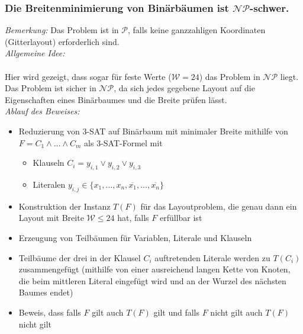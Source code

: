 \subsubsection{Die Breitenminimierung von Binärbäumen ist $\mathcal{NP}$-schwer.}
\ProofIdea
\textit{Bemerkung:} Das Problem ist in $\mathcal{P}$, falls keine ganzzahligen Koordinaten (Gitterlayout) erforderlich sind.\\
\textit{Allgemeine Idee:}\\
\\
Hier wird gezeigt, dass sogar für feste Werte ($\mathcal{W}=24$) das Problem in $\mathcal{NP}$ liegt. Das Problem ist sicher in $\mathcal{NP}$, da sich jedes gegebene Layout auf die Eigenschaften eines Binärbaumes und die Breite prüfen lässt.\\
\textit{Ablauf des Beweises:}
	\begin{itemize}
		\item Reduzierung von $3$-SAT auf Binärbaum mit minimaler Breite mithilfe von $F=C_1 \wedge \dots \wedge C_m$ als $3$-SAT-Formel mit
			\begin{itemize}
				\item Klauseln $C_i=y_{i,1}\vee y_{i,2}\vee y_{i,3}$
				\item Literalen $y_{i,j}\in\{x_1,\dots,x_n,\overline{x_1},\dots,\overline{x_n}\}$
			\end{itemize}
		\item Konstruktion der Instanz $T(F)$ für das Layoutproblem, die genau dann ein Layout mit Breite $\mathcal{W}\leq 24$ hat, falls $F$ erfüllbar ist
		\item Erzeugung von Teilbäumen für Variablen, Literale und Klauseln
		\item Teilbäume der drei in der Klausel $C_i$ auftretenden Literale werden zu $T(C_i)$ zusammengefügt (mithilfe von einer ausreichend langen Kette von Knoten, die beim mittleren Literal eingefügt wird und an der Wurzel des nächsten Baumes endet)
		\item Beweis, dass falls $F$ gilt auch $T(F)$ gilt und falls $F$ nicht gilt auch $T(F)$ nicht gilt
	\end{itemize}
\topbreak
